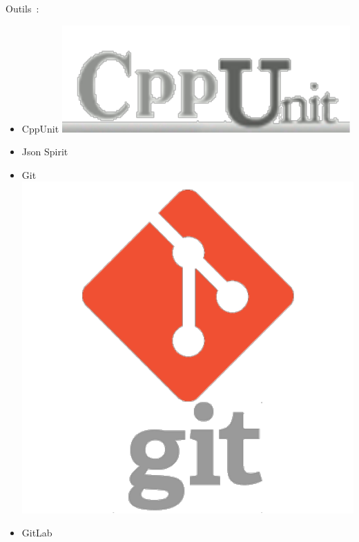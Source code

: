 \begin{frame}
Outils~:
\begin{itemize}
\item CppUnit
\includegraphics[scale=0.16]{doc/Presentation/image/cppUnit.pdf}
\item Json Spirit
\item Git
\includegraphics[scale=0.08]{doc/Presentation/image/git.pdf}
\item GitLab

\end{itemize}
\end{frame}
